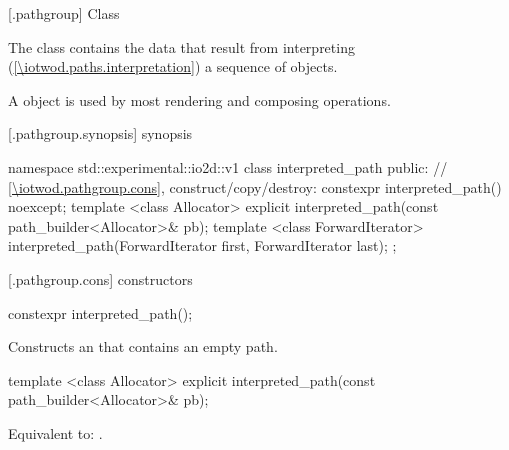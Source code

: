  [\iotwod.pathgroup] {Class }

\pnum
{}%
The class  contains the data that result from interpreting (\ref{\iotwod.paths.interpretation}) a sequence of  objects. %

\pnum
A  object is used by most rendering and composing operations.

%
%
%
%
 [\iotwod.pathgroup.synopsis] { synopsis}

\begin{codeblock}
namespace std::experimental::io2d::v1 {
  class interpreted_path {
    public:
    // \ref{\iotwod.pathgroup.cons}, construct/copy/destroy:
    constexpr interpreted_path() noexcept;
    template <class Allocator>
    explicit interpreted_path(const path_builder<Allocator>& pb);
    template <class ForwardIterator>
    interpreted_path(ForwardIterator first, ForwardIterator last);
  };
}
\end{codeblock}

 [\iotwod.pathgroup.cons] { constructors}

%
\begin{itemdecl}
constexpr interpreted_path();
\end{itemdecl}
\begin{itemdescr}
\pnum
\effects
Constructs an  that contains an empty path.
\end{itemdescr}

%
\begin{itemdecl}
template <class Allocator>
explicit interpreted_path(const path_builder<Allocator>& pb);
\end{itemdecl}
\begin{itemdescr}
\pnum
\effects
Equivalent to: .	
\end{itemdescr}

